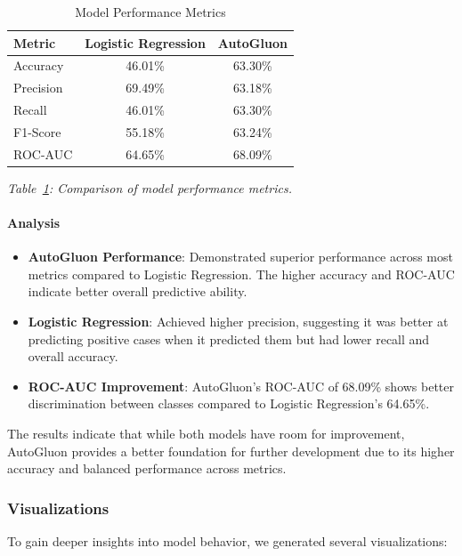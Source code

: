 \documentclass{article}
\begin{document}
\begin{table}[H]
\centering
\caption{Model Performance Metrics}\label{tab:model_performance}
\begin{tabular}{lcc}
\toprule
\textbf{Metric} & \textbf{Logistic Regression} & \textbf{AutoGluon} \\
\midrule
Accuracy & 46.01\% & 63.30\% \\
Precision & 69.49\% & 63.18\% \\
Recall & 46.01\% & 63.30\% \\
F1-Score & 55.18\% & 63.24\% \\
ROC-AUC & 64.65\% & 68.09\% \\
\bottomrule
\end{tabular}
\end{table}

\textit{Table~\ref{tab:model_performance}: Comparison of model performance metrics.}

\paragraph{Analysis}

\begin{itemize}[leftmargin=*]
    \item \textbf{AutoGluon Performance}: Demonstrated superior performance across most metrics compared to Logistic Regression. The higher accuracy and ROC-AUC indicate better overall predictive ability.
    \item \textbf{Logistic Regression}: Achieved higher precision, suggesting it was better at predicting positive cases when it predicted them but had lower recall and overall accuracy.
    \item \textbf{ROC-AUC Improvement}: AutoGluon's ROC-AUC of 68.09\% shows better discrimination between classes compared to Logistic Regression's 64.65\%.
\end{itemize}

The results indicate that while both models have room for improvement, AutoGluon provides a better foundation for further development due to its higher accuracy and balanced performance across metrics.

\subsubsection{Visualizations}

To gain deeper insights into model behavior, we generated several visualizations:
\end{document}
